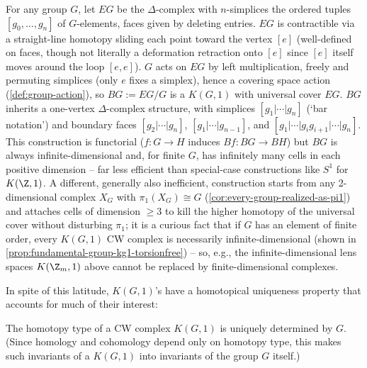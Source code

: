 \begin{example}
\label{ex:milnor-construction-eg-bg}
For any group $G$, let $EG$ be the $\Delta$-complex with $n$-simplices the ordered
tuples $[g_0,\ldots,g_n]$ of $G$-elements, faces given by deleting entries. $EG$ is
contractible via a straight-line homotopy sliding each point toward the vertex
$[e]$ (well-defined on faces, though not literally a deformation retraction onto
$[e]$ since $[e]$ itself moves around the loop $[e,e]$). $G$ acts on $EG$ by left
multiplication, freely and permuting simplices (only $e$ fixes a simplex), hence a
covering space action (\cref{def:group-action}), so $BG := EG/G$ is a $K(G,1)$ with
universal cover $EG$. $BG$ inherits a one-vertex $\Delta$-complex structure, with
simplices $[g_1|\cdots|g_n]$ (`bar notation') and boundary faces
$[g_2|\cdots|g_n]$, $[g_1|\cdots|g_{n-1}]$, and $[g_1|\cdots|g_ig_{i+1}|\cdots|g_n]$. This
construction is functorial ($f:G\to H$ induces $Bf:BG\to BH$) but $BG$ is always
infinite-dimensional and, for finite $G$, has infinitely many cells in each positive
dimension -- far less efficient than special-case constructions like $S^1$ for $K(\Z,1)$.
A different, generally also inefficient, construction starts from any 2-dimensional
complex $X_G$ with $\pi_1(X_G)\cong G$ (\cref{cor:every-group-realized-as-pi1}) and
attaches cells of dimension $\ge 3$ to kill the higher homotopy of the universal cover
without disturbing $\pi_1$; it is a curious fact that if $G$ has an element of finite
order, every $K(G,1)$ CW complex is necessarily infinite-dimensional (shown in
\cref{prop:fundamental-group-kg1-torsionfree}) -- so, e.g., the infinite-dimensional lens spaces
$K(\Z_m,1)$ above cannot be replaced by finite-dimensional complexes.
\end{example}

In spite of this latitude, $K(G,1)$'s have a homotopical uniqueness property that
accounts for much of their interest:

\begin{theorem}
\label{thm:kg1-unique-homotopy-type}
The homotopy type of a CW complex $K(G,1)$ is uniquely determined by $G$. (Since
homology and cohomology depend only on homotopy type, this makes such
invariants of a $K(G,1)$ into invariants of the group $G$ itself.)
\end{theorem}

